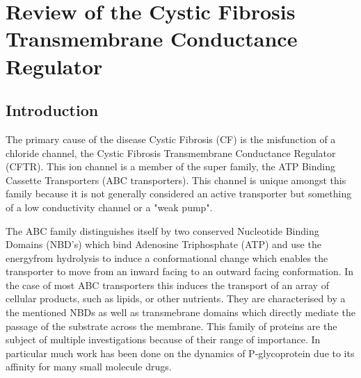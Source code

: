\chapter{Review of the Cystic Fibrosis Transmembrane Conductance Regulator}
\label{chap:cftr_review}
\newpage
\section{Introduction}

The primary cause of the disease Cystic Fibrosis (CF) is the misfunction of a chloride channel, the Cystic Fibrosis Transmembrane Conductance Regulator (CFTR). This ion channel is a member of the super family, the ATP Binding Cassette Transporters (ABC transporters). This channel is unique amongst this family because it is not generally considered an active transporter but something of a low conductivity channel or a "weak pump".

The ABC family distinguishes itself by two conserved Nucleotide Binding Domains (NBD's) which bind Adenosine Triphosphate (ATP) and use the energyfrom hydrolysis to induce a conformational change which enables the transporter to move from an inward facing to an outward facing conformation. In the case of most ABC transporters this induces the transport of an array of cellular products, such as lipids, or other nutrients. They are characterised by a the mentioned NBDs as well as transmebrane domains which directly mediate the passage of the substrate across the membrane. This family of proteins are the subject of multiple investigations because of their range of importance. In particular much work has been done on the dynamics of P-glycoprotein due to its affinity for many small molecule drugs. \cite{OMara2012}


